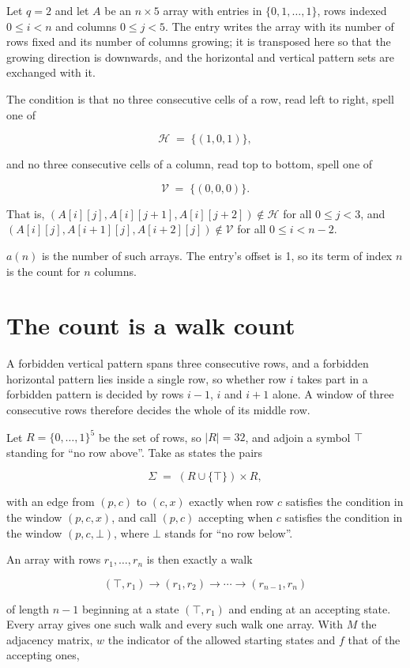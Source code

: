 \documentclass[11pt]{article}
\theoremstyle{definition}
\begin{document}
Let $q = 2$ and let $A$ be an $n \times 5$ array with entries in $\{0,1,\dots,1\}$, rows indexed $0 \le i < n$ and columns $0 \le j < 5$. The entry writes the array with its number of rows fixed and its number of columns growing; it is transposed here so that the growing direction is downwards, and the horizontal and vertical pattern sets are exchanged with it.

The condition is that no three consecutive cells of a row, read left to right, spell one of

\[\mathcal{H} \;=\; \{(1,0,1)\},\]

and no three consecutive cells of a column, read top to bottom, spell one of

\[\mathcal{V} \;=\; \{(0,0,0)\}.\]

That is, $(A[i][j],A[i][j{+}1],A[i][j{+}2]) \notin \mathcal{H}$ for all $0 \le j < 3$, and $(A[i][j],A[i{+}1][j],A[i{+}2][j]) \notin \mathcal{V}$ for all $0 \le i < n-2$.

$a(n)$ is the number of such arrays. The entry's offset is 1, so its term of index $n$ is the count for $n$ columns.

\section{The count is a walk count}

A forbidden vertical pattern spans three consecutive rows, and a forbidden horizontal pattern lies inside a single row, so whether row $i$ takes part in a forbidden pattern is decided by rows $i-1$, $i$ and $i+1$ alone. A window of three consecutive rows therefore decides the whole of its middle row.

Let $R = \{0,\dots,1\}^{5}$ be the set of rows, so $|R| = 32$, and adjoin a symbol $\top$ standing for ``no row above''. Take as states the pairs

\[\Sigma \;=\; (R \cup \{\top\}) \times R,\]

with an edge from $(p,c)$ to $(c,x)$ exactly when row $c$ satisfies the condition in the window $(p,c,x)$, and call $(p,c)$ accepting when $c$ satisfies the condition in the window $(p,c,\bot)$, where $\bot$ stands for ``no row below''.

An array with rows $r_1,\dots,r_n$ is then exactly a walk

\[(\top,r_1) \to (r_1,r_2) \to \cdots \to (r_{n-1},r_n)\]

of length $n-1$ beginning at a state $(\top,r_1)$ and ending at an accepting state. Every array gives one such walk and every such walk one array. With $M$ the adjacency matrix, $w$ the indicator of the allowed starting states and $f$ that of the accepting ones,
\end{document}
